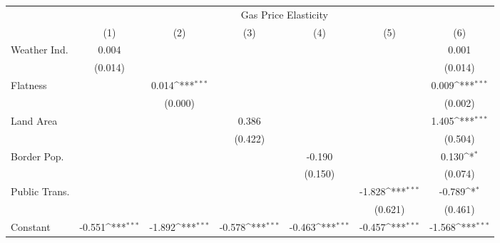 {
\def\sym#1{\ifmmode^{#1}\else\(^{#1}\)\fi}
\begin{tabular}{l*{6}{c}}
\hline\hline
            &\multicolumn{6}{c}{Gas Price Elasticity}                                                                                           \\
            &\multicolumn{1}{c}{(1)}         &\multicolumn{1}{c}{(2)}         &\multicolumn{1}{c}{(3)}         &\multicolumn{1}{c}{(4)}         &\multicolumn{1}{c}{(5)}         &\multicolumn{1}{c}{(6)}         \\
\hline
Weather Ind.&       0.004         &                     &                     &                     &                     &       0.001         \\
            &     (0.014)         &                     &                     &                     &                     &     (0.014)         \\
[1em]
Flatness    &                     &       0.014\sym{***}&                     &                     &                     &       0.009\sym{***}\\
            &                     &     (0.000)         &                     &                     &                     &     (0.002)         \\
[1em]
Land Area   &                     &                     &       0.386         &                     &                     &       1.405\sym{***}\\
            &                     &                     &     (0.422)         &                     &                     &     (0.504)         \\
[1em]
Border Pop. &                     &                     &                     &      -0.190         &                     &       0.130\sym{*}  \\
            &                     &                     &                     &     (0.150)         &                     &     (0.074)         \\
[1em]
Public Trans.&                     &                     &                     &                     &      -1.828\sym{***}&      -0.789\sym{*}  \\
            &                     &                     &                     &                     &     (0.621)         &     (0.461)         \\
[1em]
Constant    &      -0.551\sym{***}&      -1.892\sym{***}&      -0.578\sym{***}&      -0.463\sym{***}&      -0.457\sym{***}&      -1.568\sym{***}\\

\end{tabular}}
